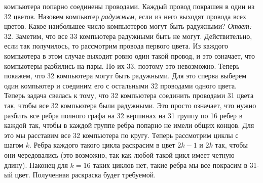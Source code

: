  компьютера попарно соединены проводами.
Каждый провод покрашен в один из 32 цветов.
Назовем компьютер \emph{радужным}, если из него выходят провода всех цветов.
Какое наибольшее число компьютеров могут быть радужными?
\solution
\emph{Ответ:} 32.
Заметим, что все 33 компьютера радужными быть не могут.
Действительно, если так получилось, то рассмотрим провода первого цвета.
Из каждого компьютера в этом случае выходит ровно один такой провод, и это
означает, что компьютеры разбились на пары.
Но их 33, поэтому это невозможно.
Теперь покажем, что 32 компьютера могут быть радужными.
Для это сперва выберем один компьютер и соединим его с остальными 32 проводами
одного цвета.
Теперь задача свелась к тому, что 32 компьютера соединить проводами 31 цвета
так, чтобы все 32 компьютера были радужными.
Это просто означает, что нужно разбить все ребра полного графа на 32 вершинах
на 31 группу по 16 ребер в каждой так, чтобы в каждой группе ребра попарно не
имели общих концов.
Для это мы расставим все 32 компьютера по кругу.
Теперь рассмотрим циклы с шагом $k$.
Ребра каждого такого цикла раскрасим в цвет $2 k - 1$ и $2 k$ так, чтобы они
чередовались (это возможно, так как любой такой цикл имеет четную длину).
Наконец для $k = 16$ таких циклов нет, такие ребра мы все покрасим в 31-ый
цвет.
Полученная раскраска будет требуемой.
\endproblem
